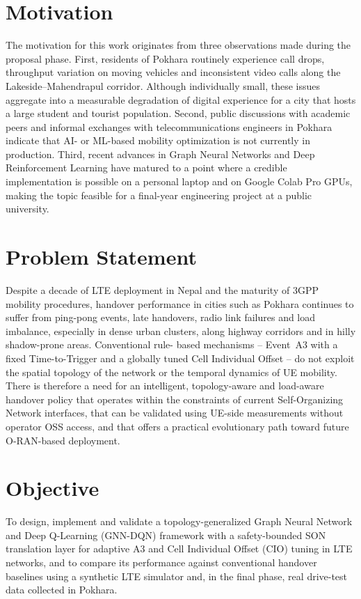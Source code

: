 \documentclass[12pt,a4paper,oneside]{report}
\begin{document}
\section{Motivation}

The motivation for this work originates from three observations made
during the proposal phase. First, residents of Pokhara routinely
experience call drops, throughput variation on moving vehicles and
inconsistent video calls along the Lakeside--Mahendrapul corridor.
Although individually small, these issues aggregate into a measurable
degradation of digital experience for a city that hosts a large student
and tourist population. Second, public discussions with academic peers
and informal exchanges with telecommunications engineers in Pokhara
indicate that AI- or ML-based mobility optimization is not currently in
production. Third, recent advances in Graph Neural Networks and Deep
Reinforcement Learning have matured to a point where a credible
implementation is possible on a personal laptop and on Google Colab Pro
GPUs, making the topic feasible for a final-year engineering project at
a public university.

\section{Problem Statement}

Despite a decade of LTE deployment in Nepal and the maturity of 3GPP
mobility procedures, handover performance in cities such as Pokhara
continues to suffer from ping-pong events, late handovers, radio link
failures and load imbalance, especially in dense urban clusters, along
highway corridors and in hilly shadow-prone areas. Conventional rule-
based mechanisms -- Event~A3 with a fixed Time-to-Trigger and a globally
tuned Cell Individual Offset -- do not exploit the spatial topology of
the network or the temporal dynamics of UE mobility. There is therefore
a need for an intelligent, topology-aware and load-aware handover policy
that operates within the constraints of current Self-Organizing Network
interfaces, that can be validated using UE-side measurements without
operator OSS access, and that offers a practical evolutionary path
toward future O-RAN-based deployment.

\section{Objective}

To design, implement and validate a topology-generalized Graph Neural
Network and Deep Q-Learning (GNN-DQN) framework with a safety-bounded
SON translation layer for adaptive A3 and Cell Individual Offset (CIO)
tuning in LTE networks, and to compare its performance against
conventional handover baselines using a synthetic LTE simulator and, in
the final phase, real drive-test data collected in Pokhara.
\end{document}
